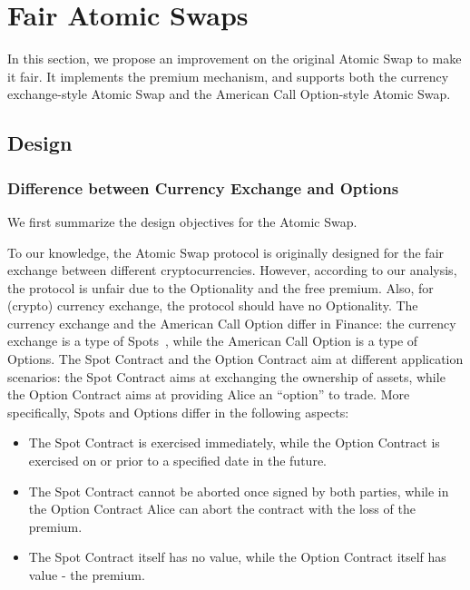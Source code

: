 \section{Fair Atomic Swaps}
\label{sec:fair_atomic_swap}

In this section, we propose an improvement on the original Atomic Swap to make it fair.
It implements the premium mechanism, and supports both the currency exchange-style Atomic Swap and the American Call Option-style Atomic Swap.


\subsection{Design}

\subsubsection{Difference between Currency Exchange and Options}
\label{subsubsec:diff_spot_option}

We first summarize the design objectives for the Atomic Swap.

To our knowledge, the Atomic Swap protocol is originally designed for the fair exchange between different cryptocurrencies.
However, according to our analysis, the protocol is unfair due to the Optionality and the free premium.
Also, for (crypto) currency exchange, the protocol should have no Optionality.
The currency exchange and the American Call Option differ in Finance: the currency exchange is a type of Spots~\cite{hull1991introduction}, while the American Call Option is a type of Options.
The Spot Contract and the Option Contract aim at different application scenarios: the Spot Contract aims at exchanging the ownership of assets, while the Option Contract aims at providing Alice an ``option'' to trade.
More specifically, Spots and Options differ in the following aspects:

\begin{itemize}
    \item The Spot Contract is exercised immediately, while the Option Contract is exercised on or prior to a specified date in the future.
    \item The Spot Contract cannot be aborted once signed by both parties, while in the Option Contract Alice can abort the contract with the loss of the premium.
    \item The Spot Contract itself has no value, while the Option Contract itself has value - the premium.
\end{itemize}

